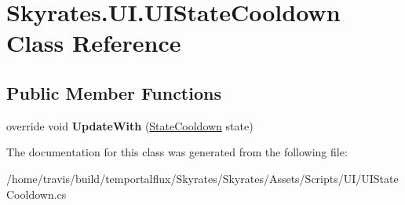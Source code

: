 \hypertarget{class_skyrates_1_1_u_i_1_1_u_i_state_cooldown}{\section{Skyrates.\-U\-I.\-U\-I\-State\-Cooldown Class Reference}
\label{class_skyrates_1_1_u_i_1_1_u_i_state_cooldown}
}
\subsection*{Public Member Functions}
\begin{DoxyCompactItemize}
\item 
\hypertarget{class_skyrates_1_1_u_i_1_1_u_i_state_cooldown_ad09e4b624d563426c57271404161db93}{override void {\bfseries Update\-With} (\hyperlink{class_skyrates_1_1_misc_1_1_state_cooldown}{State\-Cooldown} state)}\label{class_skyrates_1_1_u_i_1_1_u_i_state_cooldown_ad09e4b624d563426c57271404161db93}

\end{DoxyCompactItemize}


The documentation for this class was generated from the following file\-:\begin{DoxyCompactItemize}
\item 
/home/travis/build/temportalflux/\-Skyrates/\-Skyrates/\-Assets/\-Scripts/\-U\-I/U\-I\-State\-Cooldown.\-cs\end{DoxyCompactItemize}
